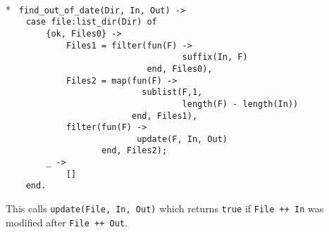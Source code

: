 \begin{flushleft}
\label{utilities_6_8}
\\*
\tt
\noindent{}%
\verb&find_out_of_date(Dir, In, Out) ->&\\
\noindent{}%
\verb&    case file:list_dir(Dir) of&\\
\noindent{}%
\verb&        {ok, Files0} ->&\\
\noindent{}%
\verb&            Files1 = filter(fun(F) -> &\\
\noindent{}%
\verb&                                   suffix(In, F) &\\
\noindent{}%
\verb&                            end, Files0),&\\
\noindent{}%
\verb&            Files2 = map(fun(F) -> &\\
\noindent{}%
\verb&                           sublist(F,1,&\\
\noindent{}%
\verb&                                   length(F) - length(In)) &\\
\noindent{}%
\verb&                         end, Files1),&\\
\noindent{}%
\verb&            filter(fun(F) ->&\\
\noindent{}%
\verb&                          update(F, In, Out) &\\
\noindent{}%
\verb&                   end, Files2);&\\
\noindent{}%
\verb&        _ ->&\\
\noindent{}%
\verb&            []&\\
\noindent{}%
\verb&    end.&\\
\end{flushleft}

This calls \verb+update(File, In, Out)+ which 
returns \verb+true+ if \verb|File ++ In| 
was modified after \verb|File ++ Out|.

